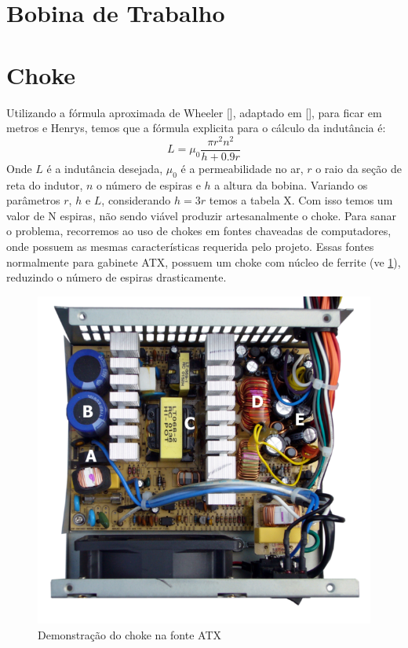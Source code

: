\section{Bobina de Trabalho}

\section{Choke}
Utilizando a fórmula aproximada de Wheeler [], adaptado em [], para ficar em metros e Henrys, temos que a fórmula explicita para o cálculo da indutância é:
\begin{equation}
L = \mu_0 \frac{\pi r^2 n^2}{h + 0.9r}
\end{equation}
Onde $ L$ é a indutância desejada, $\mu_0$ é a permeabilidade no ar, $r$ o raio da seção de reta do indutor, $n$ o número de espiras e $h$ a altura da bobina. Variando os parâmetros $r$, $h$ e $L$, considerando $h = 3r$ temos a tabela X.
Com isso temos um valor de N espiras, não sendo viável produzir artesanalmente o choke. Para sanar o problema, recorremos ao uso de chokes em fontes chaveadas de computadores, onde possuem as mesmas características requerida pelo projeto. Essas fontes normalmente para gabinete ATX, possuem um choke com núcleo de ferrite (ve \ref{fig_fonte-atx}), reduzindo o número de espiras drasticamente.

\begin{figure}[htb]
\caption{\label{fig_fonte-atx}Demonstração do choke na fonte ATX}
\begin{center}
\includegraphics[scale=0.5]{images/fonte-atx.png}
\end{center}
\end{figure}


